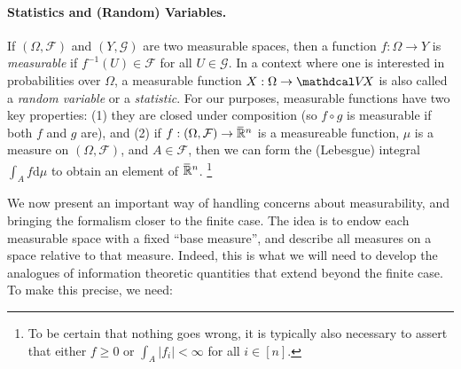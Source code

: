 

\paragraph{Statistics and (Random) Variables.} 
If $(\Omega, \mathcal F)$ and $(Y, \mathcal G)$ are two measurable spaces, then
a function $f : \Omega \to Y$ is \emph{measurable} if $f^{-1}(U) \in \mathcal F$ for all $U \in \mathcal G$. 
In a context where one is interested in probabilities over $\Omega$, 
a measurable function $X : \Omega \to \V\!X$ is also called a \emph{random variable} or a \emph{statistic}.
For our purposes, measurable functions have two key properties:
(1) they are closed under composition (so $f \circ g$ is measurable if both $f$ and $g$ are), and
(2) if $f : (\Omega, \mathcal F) \to \mskip1mu\overline{\mskip-1mu\mathbb R\!}\,^n$ is a measureable function, $\mu$ is a measure on $(\Omega, \mathcal F)$, and $A \in \mathcal F$, then we can form the (Lebesgue) integral
    $\int_{A} f \mathrm d \mu$ to obtain an element of $\mskip1mu\overline{\mskip-1mu\mathbb R\!}\,^n$.%
\footnote{To be certain that nothing goes wrong, 
    it is typically also necessary to assert that either $f \ge 0$ or $\int_A |f_i| < \infty$ for all $i \in [n]$.}



We now present an important way of handling concerns about measurability, and bringing the formalism closer to the finite case.
The idea is to endow each measurable space with a fixed ``base measure'', and describe all measures on a space relative to that measure. 
Indeed, this is what we will need to develop the analogues of information theoretic quantities that extend beyond the finite case.
To make this precise, we need:


